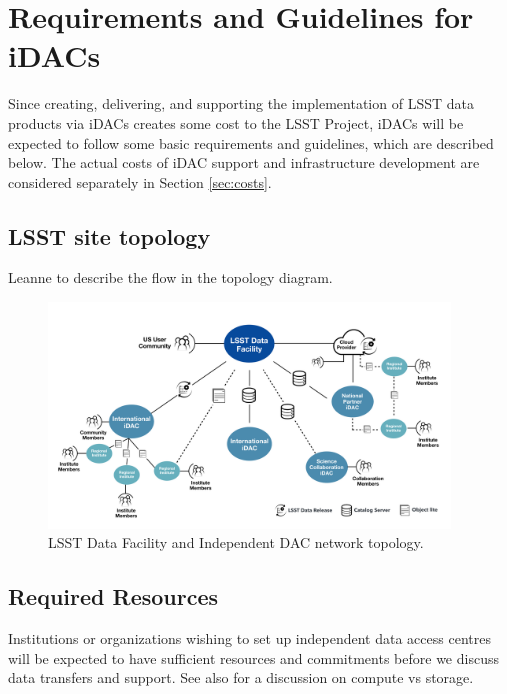 
\section{Requirements and Guidelines for iDACs}\label{sec:reqs}
Since creating, delivering, and supporting the implementation of LSST data products via iDACs creates some cost to the LSST Project, iDACs will be expected to follow some basic requirements and guidelines, which are described below.
The actual costs of iDAC support and infrastructure development are considered separately in Section \ref{sec:costs}.

\subsection{LSST site topology} \label{sec:topology}

{\color{red}Leanne to describe the flow in the topology diagram.} \newline
	
\begin{figure}
\begin{center}
\includegraphics[width=0.95\textwidth]{images_local/idac-topology}
\caption{LSST Data Facility and Independent DAC network topology.  \label{fig:idac-topology}}
\end{center}
\end{figure}

\subsection{Required Resources} \label{sec:resources}
Institutions or organizations wishing to set up independent data access centres will be expected to have
sufficient resources and commitments before we discuss data transfers and support.
See also  for a discussion on compute vs storage.

